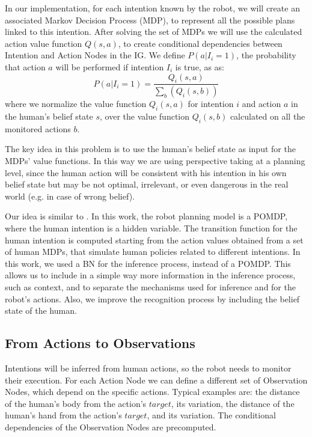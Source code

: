 In our implementation, for each intention known by the robot, we will create an associated Markov Decision Process (MDP), to represent all the possible plans linked to this intention. After solving the set of MDPs we will use the calculated action value function \(Q(s,a)\), to create conditional dependencies between Intention and Action Nodes in the IG. We define \(P(a|I_i=1)\), the probability that action $a$ will be performed if intention $I_i$ is true, as as:
\begin{equation}
 P(a|I_i=1)=\frac{Q_i(s,a)}{\sum_b(Q_i(s,b))}
\end{equation}
  where we normalize the value function $Q_i(s,a)$ for intention $i$ and action $a$ in the human's belief state $s$, over the value function $Q_i(s,b)$ calculated on all the monitored actions $b$. 


The key idea in this problem is to use the human's belief state as input for the MDPs' value functions. In this way we are using perspective taking at a planning level, since the human action will be consistent with his intention in his own belief state but may be not optimal, irrelevant, or even dangerous in the real world (e.g. in case of wrong belief).

Our idea is similar to \cite{karami2010human}. In this work, the robot planning model is a POMDP, where the human intention is a hidden variable. The transition function for the human intention is computed starting from the action values obtained from a set of human MDPs, that simulate human policies related to different intentions. In this work, we used a BN for the inference process, instead of a POMDP. This allows us to include in a simple way more information in the inference process, such as context, and to separate the mechanisms used for inference and for the robot's actions. Also, we improve the recognition process by including the belief state of the human.

\subsection{From Actions to Observations}
Intentions will be inferred from human actions, so the robot needs to monitor their execution. For each Action Node we can define a different set of Observation Nodes, which depend on the specific actions. Typical examples are: the distance of the human's body from the action's $target$, its variation, the distance of the human's hand from the action's $target$, and its variation. The conditional dependencies of the Observation Nodes are precomputed.

